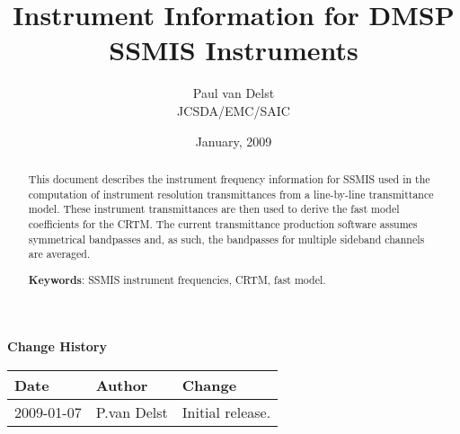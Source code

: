 




\newcommand{\frequency}[1]{\ensuremath{f_{#1}}}
\newcommand{\bfrequency}[1]{\boldmath\frequency{#1}\unboldmath}
\newcommand{\bdf}[1]{\boldmath\df{#1}\unboldmath}
\newcommand{\sideband}[1]{\ensuremath{df_{#1}}}
\newcommand{\bsideband}[1]{\boldmath\sideband{#1}\unboldmath}

\title{Instrument Information for DMSP SSMIS Instruments}
\author{Paul van Delst\\JCSDA/EMC/SAIC}
\date{January, 2009}



\maketitle


\thispagestyle{empty}
\vspace*{10cm}
\begin{center}
  {\sffamily\Large\bfseries Change History}
  \begin{table}[htp]
    \centering
    \begin{tabular}{|p{2cm}|p{3cm}|p{8cm}|}
      \hline
      \sffamily\textbf{Date} & \sffamily\textbf{Author} & \sffamily\textbf{Change}\\
      \hline\hline
      2009-01-07 & P.van Delst & Initial release.\\
      \hline
    \end{tabular}
  \end{table}
\end{center}
\clearpage
{}
\setcounter{page}{1}

\begin{abstract}
This document describes the instrument frequency information for SSMIS used in the computation of instrument resolution transmittances from a line-by-line transmittance model. These instrument transmittances are then used to derive the fast model coefficients for the CRTM. The current transmittance production software assumes symmetrical bandpasses and, as such, the bandpasses for multiple sideband channels are averaged.

\textbf{Keywords}: SSMIS instrument frequencies, CRTM, fast model.
\end{abstract}


